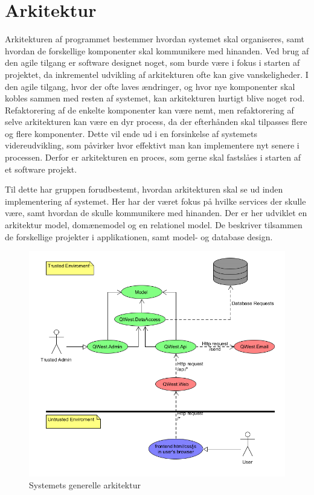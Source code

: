 \chapter{Arkitektur}\label{ch:Arkitektur}

Arkitekturen af programmet bestemmer hvordan systemet skal organiseres, samt hvordan de forskellige komponenter skal kommunikere med hinanden. Ved brug af den agile tilgang er software designet noget, som burde være i fokus i starten af projektet, da inkrementel udvikling af arkitekturen ofte kan give vanskeligheder. I den agile tilgang, hvor der ofte laves ændringer, og hvor nye komponenter skal kobles sammen med resten af systemet, kan arkitekturen hurtigt blive noget rod. Refaktorering af de enkelte komponenter kan være nemt, men refaktorering af selve arkitekturen kan være en dyr process, da der efterhånden skal tilpasses flere og flere komponenter. Dette vil ende ud i en forsinkelse af systemets videreudvikling, som påvirker hvor effektivt man kan implementere nyt senere i processen. Derfor er arkitekturen en proces, som gerne skal fastslåes i starten af et software projekt.\cite{Sommerville}

Til dette har gruppen forudbestemt, hvordan arkitekturen skal se ud inden implementering af systemet. Her har der været fokus på hvilke services der skulle være, samt hvordan de skulle kommunikere med hinanden. Der er her udviklet en arkitektur model, domænemodel og en relationel model. De beskriver tilsammen de forskellige projekter i applikationen, samt model- og database design. 

\begin{figure}[H]
    \includegraphics[width=\linewidth]{figures/Architecture.png}
    \caption{Systemets generelle arkitektur}
    \label{fig:Architecture}
\end{figure}

